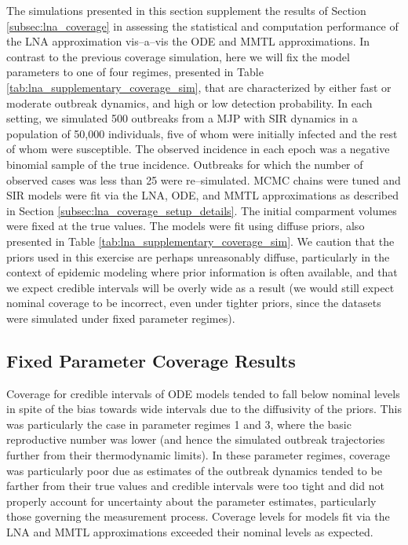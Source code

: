 The simulations presented in this section supplement the results of Section \ref{subsec:lna_coverage} in assessing the statistical and computation performance of the LNA approximation vis--a--vis the ODE and MMTL approximations. In contrast to the previous coverage simulation, here we will fix the model parameters to one of four regimes, presented in Table \ref{tab:lna_supplementary_coverage_sim}, that are characterized by either fast or moderate outbreak dynamics, and high or low detection probability. In each setting, we simulated 500 outbreaks from a MJP with SIR dynamics in a population of 50,000 individuals, five of whom were initially infected and the rest of whom were susceptible. The observed incidence in each epoch was a negative binomial sample of the true incidence. Outbreaks for which the number of observed cases was less than 25 were re--simulated. MCMC chains were tuned and SIR models were fit via the LNA, ODE, and MMTL approximations as described in Section \ref{subsec:lna_coverage_setup_details}. The initial comparment volumes were fixed at the true values. The models were fit using diffuse priors, also presented in Table \ref{tab:lna_supplementary_coverage_sim}. We caution that the priors used in this exercise are perhaps unreasonably diffuse, particularly in the context of epidemic modeling where prior information is often available, and that we expect credible intervals will be overly wide as a result (we would still expect nominal coverage to be incorrect, even under tighter priors, since the datasets were simulated under fixed parameter regimes).
\newpage
\subsection{Fixed Parameter Coverage Results}
\label{subsec:lna_fixedpar_sim_results}

Coverage for credible intervals of ODE models tended to fall below nominal levels in spite of the bias towards wide intervals due to the diffusivity of the priors. This was particularly the case in parameter regimes 1 and 3, where the basic reproductive number was lower (and hence the simulated outbreak trajectories further from their thermodynamic limits). In these parameter regimes, coverage was particularly poor due as estimates of the outbreak dynamics tended to be farther from their true values and credible intervals were too tight and did not properly account for uncertainty about the parameter estimates, particularly those governing the measurement process. Coverage levels for models fit via the LNA and MMTL approximations exceeded their nominal levels as expected. 


